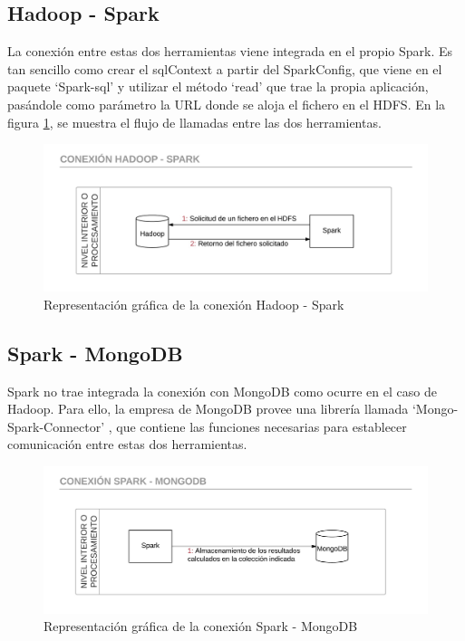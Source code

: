 \subsection{Hadoop - Spark}
La conexión entre estas dos herramientas viene integrada en el propio Spark. Es tan sencillo como crear el sqlContext a partir del SparkConfig, que viene en el paquete ‘Spark-sql’ y utilizar el método ‘read’ que trae la propia aplicación, pasándole como parámetro la URL donde se aloja el fichero en el HDFS. En la figura \ref{fig:conexionhadoopspark}, se muestra el flujo de llamadas entre las dos herramientas.

\begin{figure}
	\centering
	\includegraphics[width=1\linewidth]{imagenes/Conexion_Hadoop_Spark}
	\caption{Representación gráfica de la conexión Hadoop - Spark}
	\label{fig:conexionhadoopspark}
\end{figure}

\subsection{Spark - MongoDB}
Spark no trae integrada la conexión con MongoDB como ocurre en el caso de Hadoop. Para ello, la empresa de MongoDB provee una librería llamada ‘Mongo-Spark-Connector’ \cite{SparkMongoConexion}, que contiene las funciones necesarias para establecer comunicación entre estas dos herramientas. 

\begin{figure}
	\centering
	\includegraphics[width=1\linewidth]{imagenes/Conexion_Spark_MongoDB}
	\caption{Representación gráfica de la conexión Spark - MongoDB}
	\label{fig:conexionsparkmongodb}
\end{figure}

